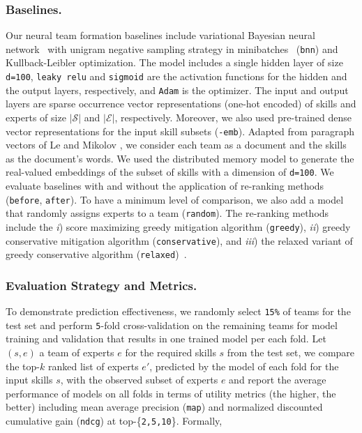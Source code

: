 \documentclass[runningheads]{llncs}
\begin{document}
\subsubsection{Baselines.}
Our neural team formation baselines include variational Bayesian neural network~\cite{DBLP:conf/cikm/RadFKSB20} with unigram negative sampling strategy in minibatches~\cite{DBLP:conf/cikm/DashtiSF22} (\texttt{bnn}) and Kullback-Leibler optimization. The model includes a single hidden layer of size \texttt{d=100}, \texttt{leaky relu} and \texttt{sigmoid} are the activation functions for the hidden and the output layers, respectively, and \texttt{Adam} is the optimizer. The input and output layers are sparse occurrence vector representations (one-hot encoded) of skills and experts of size $|\mathcal{S}|$ and $|\mathcal{E}|$, respectively. Moreover, we also used pre-trained dense vector representations for the input skill subsets (\texttt{-emb}). Adapted from paragraph vectors of Le and Mikolov \cite{10.5555/3044805.3045025}, we consider each team as a document and the skills as the document's words. We used the distributed memory model to generate the real-valued embeddings of the subset of skills with a dimension of \texttt{d=100}. We evaluate baselines with and without the application of re-ranking methods (\texttt{before}, \texttt{after}). To have a minimum level of comparison, we also add a model that randomly assigns experts to a team (\texttt{random}). The re-ranking methods include the \textit{i}) score maximizing greedy mitigation algorithm (\texttt{greedy}), \textit{ii}) greedy conservative mitigation algorithm (\texttt{conservative}), and \textit{iii}) the relaxed variant of greedy conservative algorithm (\texttt{relaxed})~\cite{DBLP:conf/kdd/GeyikAK19}.
\subsubsection{Evaluation Strategy and Metrics.}
To demonstrate prediction effectiveness, we randomly select \texttt{15\%} of teams for the test set and perform \texttt{5}-fold cross-validation on the remaining teams for model training and validation that results in one trained model per each fold. Let $(s, e)$ a team of experts $e$ for the required skills $s$ from the test set, we compare the top-$k$ ranked list of experts $e'$, predicted by the model of each fold for the input skills $s$, with the observed subset of experts $e$ and report the average performance of models on all folds in terms of utility metrics (the higher, the better) including mean average precision (\texttt{map}) and normalized discounted cumulative gain (\texttt{ndcg}) at top-\{\texttt{2,5,10}\}. Formally,
\end{document}
